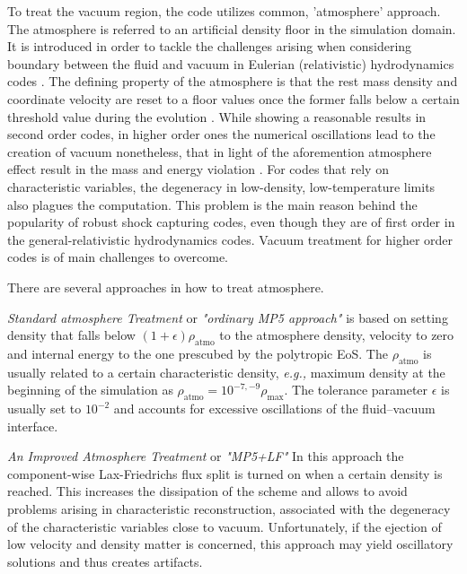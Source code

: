 \documentclass[11pt,a4paper,headinclude=true,DIV=14,BCOR=8mm,chapterprefix,listof=totoc,twoside,openright,abstracton]{scrbook}
\begin{document}
To treat the vacuum region, the code utilizes common, 'atmosphere' approach. The atmosphere is referred to an artificial density floor in the simulation domain. It is introduced in order to tackle the challenges arising when considering boundary between the fluid and vacuum in Eulerian (relativistic) hydrodynamics codes \cite{Galeazzi:mThesis:2008,Kastaun:2006,Millmore:2009dk}. 
The defining property of the atmosphere is that the rest mass density and coordinate velocity are reset to a floor values once the former falls below a certain threshold value during the evolution \cite{Font:2001ew,Baiotti:2004wn}. While showing a reasonable results in second order codes, in higher order ones the numerical oscillations lead to the creation of vacuum nonetheless, that in light of the aforemention atmosphere effect result in the mass and energy violation \cite{Radice:2011qr}. For codes that rely on characteristic variables, the degeneracy in low-density, low-temperature limits also plagues the computation. This problem is the main reason behind the popularity of robust shock capturing codes, even though they are of first order in the general-relativistic hydrodynamics codes. Vacuum treatment for higher order codes is of main challenges to overcome.

There are several approaches in how to treat atmosphere. 

\textit{Standard atmosphere Treatment} or \textit{"ordinary MP5 approach"} is based on setting density that falls below $(1+\epsilon)\rho_{\text{atmo}}$ to the atmosphere density, velocity to zero and internal energy to the one prescubed by the polytropic EoS. The $\rho_{\text{atmo}}$ is usually related to a certain characteristic density, \textit{e.g.,} maximum density at the beginning of the simulation as $\rho_{\text{atmo}} = 10^{-7,-9}\rho_{\text{max}}$. The tolerance parameter $\epsilon$ is usually set to $10^{-2}$ and accounts for excessive oscillations of the fluid–vacuum interface. 

\textit{An Improved Atmosphere Treatment} or \textit{"MP5+LF"} In this approach the component-wise Lax-Friedrichs flux split is turned on when a certain density is reached. This increases the dissipation of the scheme and allows to avoid problems arising in characteristic reconstruction, associated with the degeneracy of the characteristic variables close to vacuum. Unfortunately, if the ejection of low velocity and density matter is concerned, this approach may yield oscillatory solutions and thus creates artifacts. 
\end{document}
